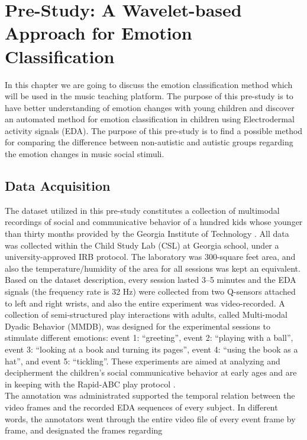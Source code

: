 \chapter{Pre-Study: A Wavelet-based Approach for Emotion Classification}
In this chapter we are going to discuss the emotion classification method which will be
used in the music teaching platform. The purpose of this pre-study is to have better
understanding of emotion changes with young children and discover an automated method
for emotion classification in children using Electrodermal activity signals (EDA). 
The purpose of this pre-study is to find a possible method for comparing the difference 
between non-autistic and autistic groups regarding the emotion changes in music social stimuli.\\

\section{Data Acquisition}
The dataset utilized in this pre-study constitutes a collection of multimodal recordings of social and 
communicative behavior of a hundred kids whose younger than thirty months provided by the Georgia 
Institute of Technology \cite{rehg2013decoding}. All data was collected within the Child Study 
Lab (CSL) at Georgia school, under a university-approved IRB protocol. The laboratory was 
300-square feet area, and also the temperature/humidity of the area for all sessions was 
kept an equivalent. Based on the dataset description, every session lasted 3–5 minutes and the 
EDA signals (the frequency rate is 32 Hz) were collected from two Q-sensors attached to 
left and right wrists, and also the entire experiment was video-recorded. A collection of semi-structured 
play interactions with adults, called Multi-modal Dyadic Behavior (MMDB), was designed 
for the experimental sessions to stimulate different emotions: event 1: “greeting”, 
event 2: “playing with a ball”, event 3: “looking at a book and turning its pages”,
event 4: “using the book as a hat”, and event 5: “tickling”. These experiments are aimed 
at analyzing and decipherment the children’s social communicative behavior at early ages 
and are in keeping with the Rapid-ABC play protocol \cite{ousley2012rapid}.\\
The annotation was administrated supported the temporal relation between the video frames and 
the recorded EDA sequences of every subject. In different words, the annotators went through 
the entire video file of every event frame by frame, and designated the frames regarding 
